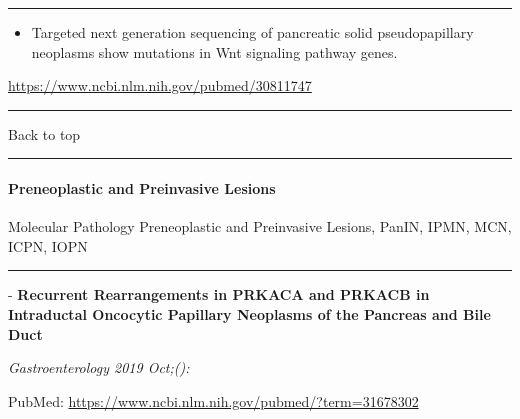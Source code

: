 \documentclass[
]{article}
\providecommand{\tightlist}{%
  \setlength{\itemsep}{0pt}\setlength{\parskip}{0pt}}
\renewcommand{\linethickness}{0.05em}
\begin{document}
\begin{center}\rule{0.5\linewidth}{\linethickness}\end{center}

\begin{itemize}
\tightlist
\item
  Targeted next generation sequencing of pancreatic solid
  pseudopapillary neoplasms show mutations in Wnt signaling pathway
  genes.
\end{itemize}

\url{https://www.ncbi.nlm.nih.gov/pubmed/30811747}

\begin{center}\rule{0.5\linewidth}{\linethickness}\end{center}

Back to top

\begin{center}\rule{0.5\linewidth}{\linethickness}\end{center}

\pagebreak

\hypertarget{preneoplastic-and-preinvasive-lesions}{%
\paragraph{Preneoplastic and Preinvasive
Lesions}\label{preneoplastic-and-preinvasive-lesions}}

Molecular Pathology Preneoplastic and Preinvasive Lesions, PanIN, IPMN,
MCN, ICPN, IOPN

\begin{center}\rule{0.5\linewidth}{\linethickness}\end{center}

- \textbf{Recurrent Rearrangements in PRKACA and PRKACB in Intraductal
Oncocytic Papillary Neoplasms of the Pancreas and Bile Duct}

\emph{Gastroenterology 2019 Oct;():}

PubMed: \url{https://www.ncbi.nlm.nih.gov/pubmed/?term=31678302}
\end{document}
